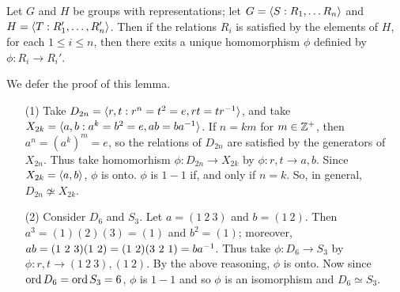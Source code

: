 \begin{lemma}\label{lemma_1.5.4}
  Let $G$ and  $H$ be groups with representations; let  $G=\langle S : R_1,
  \dots R_n\rangle$ and $H=\langle T : R_1', \dots, R_n'\rangle$. Then if the relations
  $R_i$ is satisfied by the elements of $H$, for each  $1 \leq i \leq n$, then
  there exits a unique homomorphism  $\phi$ definied by  $\phi:R_i \rightarrow
  R_i'$.
\end{lemma}
\begin{remark}
  We defer the proof of this lemma.
\end{remark}

\begin{example}\label{example_1.14}
  \begin{enumerate}
    \item[(1)] Take $D_{2n}=\langle r,t : r^n=t^2=e, rt=tr^{-1}\rangle$, and take
      $X_{2k}=\langle a,b : a^k=b^2=e, ab=ba^{-1}\rangle$. If $n=km$ for  $m
      \in \mathbb{Z}^+$, then  $a^n=(a^k)^m=e$, so the relations of $D_{2n}$ are
      satisfied by the generators of $X_{2n}$. Thus take homomorhism
      $\phi:D_{2n} \rightarrow X_{2k}$ by $\phi:r,t \rightarrow a,b$.
      Since $X_{2k}=\langle a,b\rangle$, $\phi$ is onto.  $\phi$ is $1-1$
      if, and only if  $n=k$. So, in general, $D_{2n} \not\simeq X_{2k}$.

    \item[(2)] Consider $D_6$ and  $S_3$. Let $a=(1 \ 2 \ 3)$ and $b=(1 \
      2)$. Then $a^3=(1)(2)(3)=(1)$ and $b^2=(1)$; moreover, $ab=(1 \ 2 \
      3)(1 \ 2)=(1 \ 2)(3 \ 2 \ 1)=ba^{-1}$. Thus take $\phi:D_6
      \rightarrow S_3$ by $\phi:r,t \rightarrow (1 \ 2 \ 3), (1 \ 2)$. By
      the above reasoning,  $\phi$ is onto. Now since
      $\operatorname{ord}{D_6}=\operatorname{ord}{S_3}=6$, $\phi$ is  $1-1$ and so  $\phi$ is an
      isomorphism and  $D_6 \simeq S_3$.
  \end{enumerate}
\end{example}

